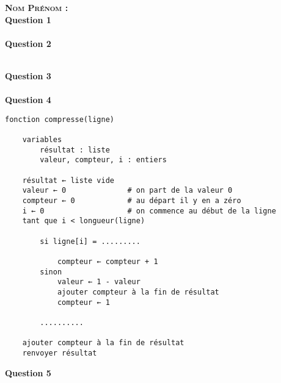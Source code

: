 \documentclass[a4paper,12pt]{article}
\begin{document}
{\large\bfseries \scshape Nom Prénom : \makebox[6cm]{\dotfill}}\\

\textbf{Question 1}\\

\\


\textbf{Question 2}\\

\\

\newpage

\textbf{Question 3}\\

\\

\textbf{Question 4}
\begin{pseudocode}\begin{verbatim}
fonction compresse(ligne)

    variables
        résultat : liste
        valeur, compteur, i : entiers
        
    résultat ← liste vide
    valeur ← 0              # on part de la valeur 0
    compteur ← 0            # au départ il y en a zéro
    i ← 0                   # on commence au début de la ligne
    tant que i < longueur(ligne)
    
        si ligne[i] = .........
        
            compteur ← compteur + 1
        sinon
            valeur ← 1 - valeur
            ajouter compteur à la fin de résultat
            compteur ← 1
            
        ..........
        
    ajouter compteur à la fin de résultat
    renvoyer résultat
\end{verbatim}
\end{pseudocode}

\textbf{Question 5}

\begin{center}
\end{center}
\end{document}
